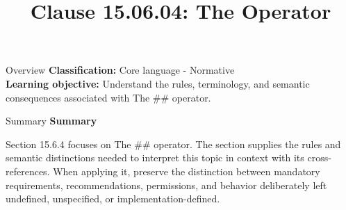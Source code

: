 \documentclass[10pt,letterpaper]{article}
\title{Clause 15.06.04: The Operator}
\author{}
\date{}
\begin{document}
\maketitle
\begin{CornellOverviewBox}{Overview}
\textbf{Classification:} Core language - Normative\\[2pt]
\textbf{Learning objective:} Understand the rules, terminology, and semantic consequences associated with The \#\# operator.
\end{CornellOverviewBox}\begin{CornellSummaryBox}{Summary}
{\sffamily\bfseries\color{Accent} Summary}\par\vspace{3pt}Section 15.6.4 focuses on The \#\# operator. The section supplies the rules and semantic distinctions needed to interpret this topic in context with its cross-references. When applying it, preserve the distinction between mandatory requirements, recommendations, permissions, and behavior deliberately left undefined, unspecified, or implementation-defined.
\end{CornellSummaryBox}
\end{document}
